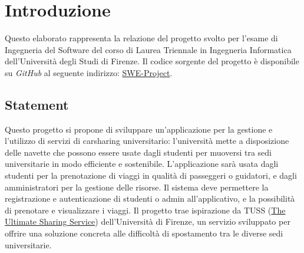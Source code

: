 \section{Introduzione}\label{sec:Introduzione}
Questo elaborato rappresenta la relazione del progetto svolto per l'esame di Ingegneria del Software del corso di Laurea Triennale in Ingegneria Informatica dell'Università degli Studi di Firenze.
Il codice sorgente del progetto è disponibile su \textit{GitHub} al seguente indirizzo: \href{https://github.com/TommyAen/SWE-Project}{SWE-Project}.
\subsection{Statement}
Questo progetto si propone di sviluppare un'applicazione per la gestione e l'utilizzo di servizi di carsharing universitario: l'università mette a disposizione delle navette che possono essere usate dagli studenti per muoversi tra sedi universitarie in modo efficiente e sostenibile.
\newline
L'applicazione sarà usata dagli studenti per la prenotazione di viaggi in qualità di passeggeri o guidatori, e dagli amministratori per la gestione delle risorse.
Il sistema deve permettere la registrazione e autenticazione di studenti o admin all'applicativo, e la possibilità di prenotare e visualizzare i viaggi.
Il progetto trae ispirazione da TUSS (\href{https://www.tuss.unifi.it/}{The Ultimate Sharing Service}) dell'Università di Firenze, un servizio sviluppato per offrire una soluzione concreta alle difficoltà di spostamento tra le diverse sedi universitarie.
